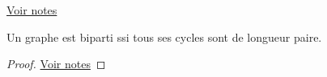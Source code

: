 \begin{myexem}
  \href{https://dl.dropboxusercontent.com/u/44092863/Graph_Theory_Romain_Capron.pdf}{Voir notes} \addTODO
\end{myexem}

\begin{mytheo} 
  Un graphe est biparti ssi tous ses cycles sont de longueur paire.
  \begin{proof}
     \href{https://dl.dropboxusercontent.com/u/44092863/Graph_Theory_Romain_Capron.pdf}{Voir notes} \addTODO
  \end{proof}
\end{mytheo}
